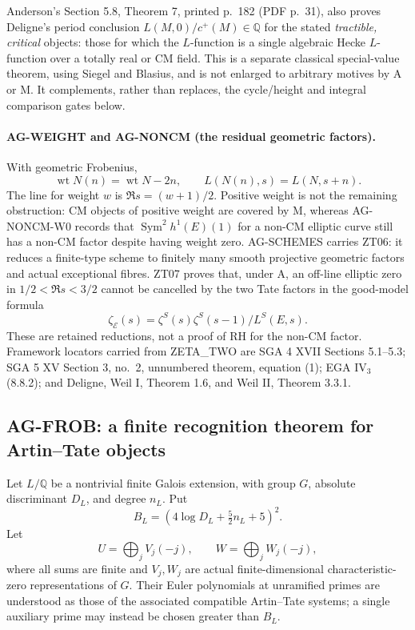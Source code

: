 Anderson's Section 5.8, Theorem 7, printed p.~182 (PDF p.~31), also
proves Deligne's period conclusion
$L(M,0)/c^+(M)\in\mathbb Q$ for the stated \emph{tractible, critical}
objects: those for which the $L$-function is a single algebraic Hecke
$L$-function over a totally real or CM field. This is a separate
classical special-value theorem, using Siegel and Blasius, and is not
enlarged to arbitrary motives by A or M. It complements, rather than
replaces, the cycle/height and integral comparison gates below.

\paragraph{AG-WEIGHT and AG-NONCM (the residual geometric factors).}
With geometric Frobenius,
\[
 \operatorname{wt}N(n)=\operatorname{wt}N-2n,
 \qquad L(N(n),s)=L(N,s+n).
\]
The line for weight $w$ is $\Re s=(w+1)/2$. Positive weight is not the
remaining obstruction: CM objects of positive weight are covered by M,
whereas AG-NONCM-W0 records that $\operatorname{Sym}^2h^1(E)(1)$ for a non-CM elliptic curve still
has a non-CM factor despite having weight zero. AG-SCHEMES carries ZT06: it reduces a finite-type
scheme to finitely many smooth projective geometric factors and actual
exceptional fibres. ZT07 proves that, under A, an off-line elliptic zero
in $1/2<\Re s<3/2$ cannot be cancelled by the two Tate factors in the
good-model formula
\[
 \zeta_{\mathcal E}(s)
   =\zeta^S(s)\zeta^S(s-1)/L^S(E,s).
\]
These are retained reductions, not a proof of RH for the non-CM factor.
Framework locators carried from ZETA\_TWO are SGA 4 XVII Sections 5.1--5.3;
SGA 5 XV Section 3, no.~2, unnumbered theorem, equation (1);
EGA IV$_3$ (8.8.2); and Deligne, Weil I, Theorem 1.6, and Weil II,
Theorem 3.3.1.

\subsection{AG-FROB: a finite recognition theorem for Artin--Tate objects}
\label{ag:frob}

Let $L/\mathbb Q$ be a nontrivial finite Galois extension, with group $G$,
absolute discriminant $D_L$, and degree $n_L$. Put
\[
 B_L=(4\log D_L+\tfrac52 n_L+5)^2.
\]
Let
\[
 U=\bigoplus_j V_j(-j),\qquad W=\bigoplus_j W_j(-j),
\]
where all sums are finite and $V_j,W_j$ are actual finite-dimensional
characteristic-zero representations of $G$. Their Euler polynomials at
unramified primes are understood as those of the associated compatible
Artin--Tate systems; a single auxiliary prime may instead be chosen greater
than $B_L$.

